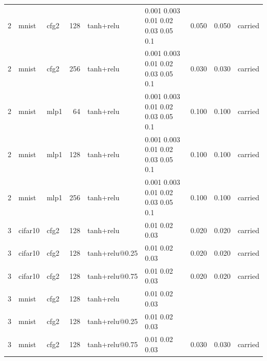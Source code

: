 \begin{table}[htbp]
{\begin{tabular}{@{}rllrllrrl@{}}
2 & mnist & cfg2 & 128 & tanh+relu & 0.001 0.003 0.01 0.02 0.03 0.05 0.1 & 0.050 & 0.050 & carried \\
2 & mnist & cfg2 & 256 & tanh+relu & 0.001 0.003 0.01 0.02 0.03 0.05 0.1 & 0.030 & 0.030 & carried \\
2 & mnist & mlp1 & 64 & tanh+relu & 0.001 0.003 0.01 0.02 0.03 0.05 0.1 & 0.100 & 0.100 & carried \\
2 & mnist & mlp1 & 128 & tanh+relu & 0.001 0.003 0.01 0.02 0.03 0.05 0.1 & 0.100 & 0.100 & carried \\
2 & mnist & mlp1 & 256 & tanh+relu & 0.001 0.003 0.01 0.02 0.03 0.05 0.1 & 0.100 & 0.100 & carried \\
3 & cifar10 & cfg2 & 128 & tanh+relu & 0.01 0.02 0.03 & 0.020 & 0.020 & carried \\
3 & cifar10 & cfg2 & 128 & tanh+relu@0.25 & 0.01 0.02 0.03 & 0.020 & 0.020 & carried \\
3 & cifar10 & cfg2 & 128 & tanh+relu@0.75 & 0.01 0.02 0.03 & 0.020 & 0.020 & carried \\
3 & mnist & cfg2 & 128 & tanh+relu & 0.01 0.02 0.03 &  &  &  \\
3 & mnist & cfg2 & 128 & tanh+relu@0.25 & 0.01 0.02 0.03 &  &  &  \\
3 & mnist & cfg2 & 128 & tanh+relu@0.75 & 0.01 0.02 0.03 & 0.030 & 0.030 & carried \\
\bottomrule
\end{tabular}}
\end{table}
